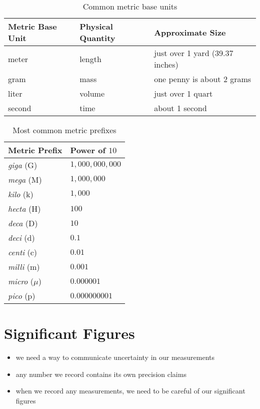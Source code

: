 \documentclass[11pt, oneside]{article}   	%
\begin{document}
\begin{table}
\centering
\begin{tabular}[b]{l | l| l}
\hline
Metric Base Unit & Physical Quantity & Approximate Size \\
\hline
meter     & length    & just over 1 yard (39.37 inches) \\
gram      & mass     & one penny is about 2 grams \\
liter         & volume & just over 1 quart \\
second   & time      & about 1 second \\
\end{tabular}
\caption{Common metric base units}
\label{table:mbaseunits}
\end{table}

\begin{table}
\centering
\begin{tabular}[b]{l|l}
\hline
Metric Prefix & Power of $10$ \\
\hline
\emph{giga} (G)           & $ 1,000,000,000 $   \\
\emph{mega} (M)         & $ 1,000,000 $   \\
\emph{kilo} (k)              & $ 1,000 $   \\
\emph{hecta} (H)          & $ 100 $   \\
\emph{deca} (D)           & $ 10 $   \\
\emph{deci} (d)             & $ 0.1 $   \\
\emph{centi} (c)            & $ 0.01 $   \\
\emph{milli}  (m)           & $ 0.001 $  \\
\emph{micro} ($\mu$)  & $ 0.000001 $  \\
\emph{pico}  (p)           & $ 0.000000001 $  \\
\end{tabular}
\caption{Most common metric prefixes}
\label{table:mprefixes}
\end{table}


\section{Significant Figures}
\begin{itemize}
\item we need a way to communicate uncertainty in our measurements
\item any number we record contains its own precision claims
\item when we record any measurements, we need to be careful of our significant figures
\end{itemize}
\end{document}
